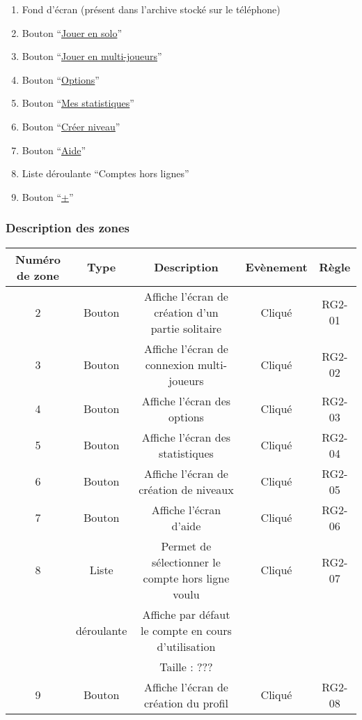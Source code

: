 \documentclass{report}
\begin{document}
		\begin{center}	
			
		\end{center}

		\begin{enumerate}
		  \item Fond d'écran (présent dans l'archive stocké sur le téléphone)
		  \item Bouton ``\hyperlink{Creer partie solo}{Jouer en solo}''
		  \item Bouton ``\hyperlink{Connexion multi-joueurs}{Jouer en multi-joueurs}''
		  \item Bouton ``\hyperlink{Options}{Options}''
		  \item Bouton ``\hyperlink{Statistiques}{Mes statistiques}''
		  \item Bouton ``\hyperlink{Creer niveau}{Créer niveau}''
		  \item Bouton ``\hyperlink{Aide}{Aide}''
		  \item Liste déroulante ``Comptes hors lignes''
		  \item Bouton ``\hyperlink{profil}{+}'' 
		\end{enumerate}

		\subsubsection{Description des zones}
		
		\begin{tabular}{|c|c|c|c|c|} \hline
			Numéro de zone & Type  & Description & Evènement &	Règle \\\hline 
			2 & Bouton & Affiche l'écran de création d'un partie solitaire & Cliqué & RG2-01 \\\hline
			3 & Bouton & Affiche l'écran de connexion multi-joueurs & Cliqué & RG2-02 \\\hline
			4 & Bouton & Affiche l'écran des options & Cliqué & RG2-03 \\\hline
			5 & Bouton & Affiche l'écran des statistiques & Cliqué & RG2-04 \\\hline
			6 & Bouton & Affiche l'écran de création de niveaux & Cliqué & RG2-05 \\\hline
			7 & Bouton & Affiche l'écran d'aide & Cliqué & RG2-06 \\\hline
			8 & Liste & Permet de sélectionner le compte hors ligne voulu & Cliqué & RG2-07 \\ 
			  & déroulante & Affiche par défaut le compte en cours d'utilisation & & \\
			  & & Taille : ??? & & \\\hline
			9 & Bouton & Affiche l'écran de création du profil & Cliqué & RG2-08 \\\hline
			
		\end{tabular}
		
\end{document}
